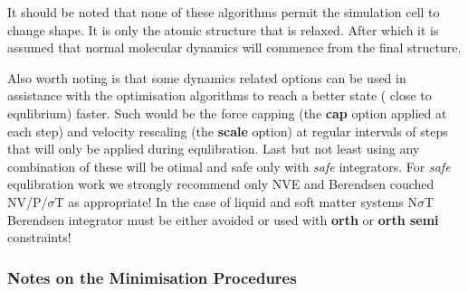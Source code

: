 It should be noted that none of these algorithms permit the simulation
cell to change shape.  It is only the atomic structure that is relaxed.
After which it is assumed that normal molecular dynamics will commence
from the final structure.

Also worth noting is that some dynamics related options can be used in
assistance with the optimisation algorithms to reach a better state (
close to equlibrium) faster.  Such would be the force capping (the
{\bf cap} option applied at each step) and velocity rescaling (the
{\bf scale} option) at regular intervals of steps that will only be
applied during equlibration.  Last but not least using any combination
of these will be otimal and safe only with {\it safe} integrators.
For {\it safe} equlibration work we strongly recommend only NVE and
Berendsen couched NV/P/$\sigma$T as appropriate!  In the case of liquid
and soft matter systems N$\sigma$T Berendsen integrator must be either
avoided or used with {\bf orth} or {\bf orth semi} constraints!

\subsubsection*{Notes on the Minimisation Procedures}

